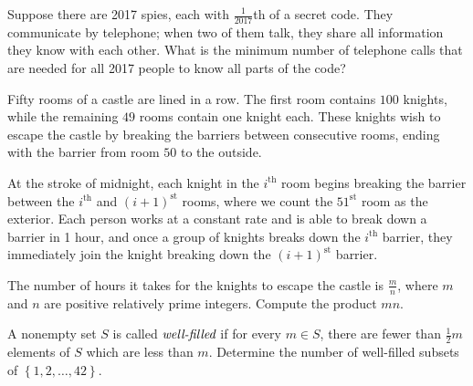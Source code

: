 \documentclass{article}
\begin{document}
\begin{prob}[BMT 2018]{3}
Suppose there are 2017 spies, each with $\frac{1}{2017}$th of a secret code. They communicate by telephone; when two of them talk, they share all information they know with each other. What is the minimum number of telephone calls that are needed for all 2017 people to know all parts of the
code?
\end{prob}

\begin{prob}{3}
Fifty rooms of a castle are lined in a row.  The first room contains $100$ knights, while the remaining $49$ rooms contain one knight each.  These knights wish to escape the castle by breaking the barriers between consecutive rooms, ending with the barrier from room $50$ to the outside.

\noindent At the stroke of midnight, each knight in the $i^{\text{th}}$ room begins breaking the barrier between the $i^{\text{th}}$ and $(i+1)^{\text{st}}$ rooms, where we count the $51^{\text{st}}$ room as the exterior.  Each person works at a constant rate and is able to break down a barrier in 1 hour, and once a group of knights breaks down the $i^{\text{th}}$ barrier, they immediately join the knight breaking down the $(i+1)^{\text{st}}$ barrier.

\noindent The number of hours it takes for the knights to escape the castle is $\tfrac mn$, where $m$ and $n$ are positive relatively prime integers.  Compute the product $mn$.
\end{prob}

\begin{prob}[HMMT 2016 T6]{13}
A nonempty set $S$ is called $\emph{well-filled}$ if for every $m \in S$, there are fewer than $\frac 12 m$ elements of $S$ which are less than $m$. Determine the number of well-filled subsets of $\left\{ 1,2,\dots,42 \right\}$.
\end{prob}
\end{document}
